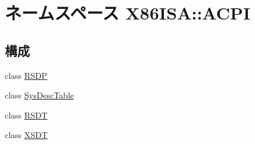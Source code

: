 \hypertarget{namespaceX86ISA_1_1ACPI}{
\section{ネームスペース X86ISA::ACPI}
\label{namespaceX86ISA_1_1ACPI}
}
\subsection*{構成}
\begin{DoxyCompactItemize}
\item 
class \hyperlink{classX86ISA_1_1ACPI_1_1RSDP}{RSDP}
\item 
class \hyperlink{classX86ISA_1_1ACPI_1_1SysDescTable}{SysDescTable}
\item 
class \hyperlink{classX86ISA_1_1ACPI_1_1RSDT}{RSDT}
\item 
class \hyperlink{classX86ISA_1_1ACPI_1_1XSDT}{XSDT}
\end{DoxyCompactItemize}
